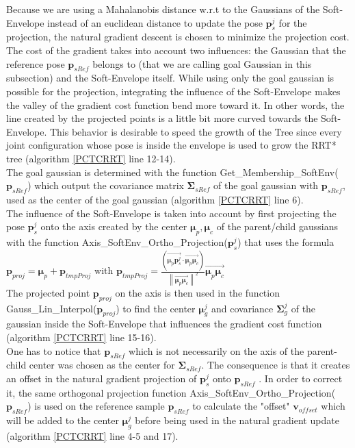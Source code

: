 \documentclass[letterpaper, 10 pt, conference]{ieeeconf}  %
\newcommand{\mb}[1]{{\boldsymbol{#1}}}
\newcommand\norm[1]{\left\lVert#1\right\rVert}
\begin{document}
Because we are using a Mahalanobis distance w.r.t to the Gaussians of the Soft-Envelope instead of an euclidean distance to update the pose $\mb{p}_s^j$ for the projection, the natural gradient descent is chosen \cite{WhyAdaptiveGrad} to minimize the projection cost. The cost of the gradient takes into account two influences: the Gaussian that the reference pose $\mb{p}_{sRef}$ belongs to (that we are calling goal Gaussian in this subsection) and the Soft-Envelope itself. While using only the goal gaussian is possible for the projection, integrating the influence of the Soft-Envelope makes the valley of the gradient cost function bend more toward it. In other words, the line created by the projected points is a little bit more curved towards the Soft-Envelope. This behavior is desirable to speed the growth of the Tree since every joint configuration whose pose is inside the envelope is used to grow the RRT* tree (algorithm \ref{PCTCRRT} line 12-14).\\
The goal gaussian is determined with the function {\selectfont Get\_Membership\_SoftEnv($\mb{p}_{sRef}$)} which output the covariance matrix $\mb{\Sigma}_{sRef}$ of the goal gaussian with $\mb{p}_{sRef}$, used as the center of the goal gaussian (algorithm \ref{PCTCRRT} line 6).\\
The influence of the Soft-Envelope is taken into account by first projecting the pose $\mb{p}_s^j$ onto the axis created by the center $\mb{\mu}_p, \mb{\mu}_c$ of the parent/child gaussians with the function {\selectfont Axis\_SoftEnv\_Ortho\_Projection($\mb{p}_s^j$)} that uses the formula $\mb{p}_{proj} = \mb{\mu}_p + \mb{p}_{tmpProj}$ with $\mb{p}_{tmpProj}=\frac{ (\overrightarrow{\mb{\mu}_p\mb{p}_s^j} \cdot \overrightarrow{\mb{\mu}_p\mb{\mu}_c})}{\norm{\overrightarrow{\mb{\mu}_p\mb{\mu}_c}}^2}\overrightarrow{\mb{\mu}_p\mb{\mu}_c} $ \\
The projected point $\mb{p}_{proj}$ on the axis is then used in the function {\selectfont Gauss\_Lin\_Interpol($\mb{p}_{proj}$)} to find the center $\mb{\mu}_g^j$ and covariance $\mb{\Sigma}_g^j$ of the gaussian inside the Soft-Envelope that influences the gradient cost function (algorithm \ref{PCTCRRT} line 15-16).\\

One has to notice that $\mb{p}_{sRef}$ which is not necessarily on the axis of the parent-child center was chosen as the center for $\mb{\Sigma}_{sRef}$. The consequence is that it creates an offset in the natural gradient projection of $\mb{p}_s^j$ onto $\mb{p}_{sRef}$  . In order to correct it, the same orthogonal projection function {\selectfont Axis\_SoftEnv\_Ortho\_Projection($\mb{p}_{sRef}$)} is used on the reference sample $\mb{p}_{sRef}$ to calculate the "offset" $\mb{v}_{offset}$ which will be added to the center $\mb{\mu}_g^j$ before being used in the natural gradient update (algorithm \ref{PCTCRRT} line 4-5 and 17).\\
\end{document}
